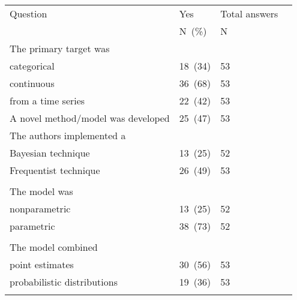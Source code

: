 \documentclass[preprint,authoryear,nonatbib]{elsarticle}
\begin{document}
\begin{table*}[ht!]
    \centering 
  \begin{tabular}{ L{5.5cm} L{1.5cm} L{1cm} L{5cm} }
    \hline
    Question                                                                    & Yes    & Total answers \\
                                                                                & N~(\%) & N \\
    \hline
    The primary target was\\
    \hspace{3mm}categorical                                                     &  18~(34)  & 53 \\
    \hspace{3mm}continuous                                                      &  36~(68)  & 53 \\
    \hspace{3mm}from a time series                                              &  22~(42)  & 53 \\
    A novel method/model was developed                                          & 25~(47)   & 53  \\
    The authors implemented a\\
    \hspace{3mm}Bayesian technique                                              & 13~(25)  & 52  \\
    \hspace{3mm}Frequentist technique                                           & 26~(49)  & 53  \\ 
 \\   
    The model was\\
    \hspace{3mm}nonparametric                                                   & 13~(25) & 52   \\
    \hspace{3mm}parametric                                                      & 38~(73) & 52   \\
\\
    The model combined\\
    \hspace{3mm}point estimates                                                 & 30~(56) & 53  \\
    \hspace{3mm}probabilistic distributions                                     & 19~(36) & 53  \\
\\    

\end{tabular}
\end{table*}
\end{document}
